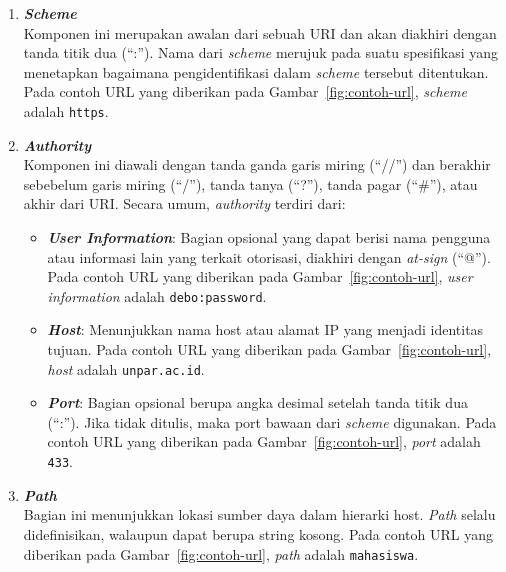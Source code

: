 \begin{enumerate}
    \item \textbf{\textit{Scheme}}\\  
    Komponen ini merupakan awalan dari sebuah URI dan akan diakhiri dengan tanda titik dua (``:''). Nama dari \textit{scheme} merujuk pada suatu spesifikasi yang menetapkan bagaimana pengidentifikasi dalam \textit{scheme} tersebut ditentukan. Pada contoh URL yang diberikan pada Gambar~\ref{fig:contoh-url}, \textit{scheme} adalah \texttt{https}.
    
    \item \textbf{\textit{Authority}}\\  
    Komponen ini diawali dengan tanda ganda garis miring (``//'') dan berakhir sebebelum garis miring (``/''), tanda tanya (``?''), tanda pagar (``\#''), atau akhir dari URI. Secara umum, \textit{authority} terdiri dari:
    
    \begin{itemize}
        
        \item \textbf{\textit{User Information}}: Bagian opsional yang dapat berisi nama pengguna atau informasi lain yang terkait otorisasi, diakhiri dengan \textit{at-sign} (``@''). Pada contoh URL yang diberikan pada Gambar~\ref{fig:contoh-url}, \textit{user information} adalah \texttt{debo:password}.
        
        \item \textbf{\textit{Host}}: Menunjukkan nama host atau alamat IP yang menjadi identitas tujuan. Pada contoh URL yang diberikan pada Gambar~\ref{fig:contoh-url}, \textit{host} adalah \texttt{unpar.ac.id}.
        
        \item \textbf{\textit{Port}}: Bagian opsional berupa angka desimal setelah tanda titik dua (``:''). Jika tidak ditulis, maka port bawaan dari \textit{scheme} digunakan. Pada contoh URL yang diberikan pada Gambar~\ref{fig:contoh-url}, \textit{port} adalah \texttt{433}.
    
    \end{itemize}
    
    \item \textbf{\textit{Path}}\\  
    Bagian ini menunjukkan lokasi sumber daya dalam hierarki host. \textit{Path} selalu didefinisikan, walaupun dapat berupa string kosong. Pada contoh URL yang diberikan pada Gambar~\ref{fig:contoh-url}, \textit{path} adalah \texttt{mahasiswa}.
    

\end{enumerate}
